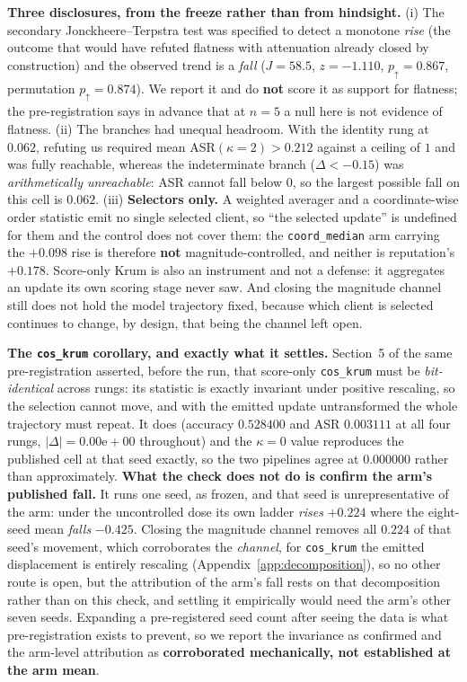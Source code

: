 \documentclass{article}
\begin{document}
\noindent \textbf{Three disclosures, from the freeze rather than from hindsight.} (i) The secondary Jonckheere--Terpstra test was specified to detect a monotone \emph{rise} (the outcome that would have refuted flatness with attenuation already closed by construction) and the observed trend is a \emph{fall} ($J{=}58.5$, $z{=}{-}1.110$, $p_{\uparrow}{=}0.867$, permutation $p_{\uparrow}{=}0.874$). We report it and do \textbf{not} score it as support for flatness; the pre-registration says in advance that at $n{=}5$ a null here is not evidence of flatness. (ii) The branches had unequal headroom. With the identity rung at $0.062$, refuting us required mean ASR$(\kappa{=}2) > 0.212$ against a ceiling of $1$ and was fully reachable, whereas the indeterminate branch ($\Delta < -0.15$) was \emph{arithmetically unreachable}: ASR cannot fall below $0$, so the largest possible fall on this cell is $0.062$. (iii) \textbf{Selectors only.} A weighted averager and a coordinate-wise order statistic emit no single selected client, so ``the selected update'' is undefined for them and the control does not cover them: the \texttt{coord\_median} arm carrying the $+0.098$ rise is therefore \textbf{not} magnitude-controlled, and neither is reputation's $+0.178$. Score-only Krum is also an instrument and not a defense: it aggregates an update its own scoring stage never saw. And closing the magnitude channel still does not hold the model trajectory fixed, because which client is selected continues to change, by design, that being the channel left open.

\noindent \textbf{The \texttt{cos\_krum} corollary, and exactly what it settles.} Section~5 of the same pre-registration asserted, before the run, that score-only \texttt{cos\_krum} must be \emph{bit-identical} across rungs: its statistic is exactly invariant under positive rescaling, so the selection cannot move, and with the emitted update untransformed the whole trajectory must repeat. It does (accuracy $0.528400$ and ASR $0.003111$ at all four rungs, $|\Delta| = 0.00\mathrm{e}{+}00$ throughout) and the $\kappa{=}0$ value reproduces the published cell at that seed exactly, so the two pipelines agree at $0.000000$ rather than approximately. \textbf{What the check does not do is confirm the arm's published fall.} It runs one seed, as frozen, and that seed is unrepresentative of the arm: under the uncontrolled dose its own ladder \emph{rises} $+0.224$ where the eight-seed mean \emph{falls} $-0.425$. Closing the magnitude channel removes all $0.224$ of that seed's movement, which corroborates the \emph{channel}, for \texttt{cos\_krum} the emitted displacement is entirely rescaling (Appendix~\ref{app:decomposition}), so no other route is open, but the attribution of the arm's fall rests on that decomposition rather than on this check, and settling it empirically would need the arm's other seven seeds. Expanding a pre-registered seed count after seeing the data is what pre-registration exists to prevent, so we report the invariance as confirmed and the arm-level attribution as \textbf{corroborated mechanically, not established at the arm mean}.
\end{document}
